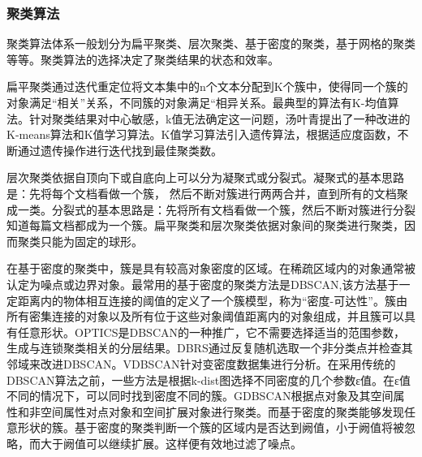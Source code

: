 \subsubsection{聚类算法}
聚类算法体系一般划分为扁平聚类、层次聚类、基于密度的聚类，基于网格的聚类等等\cite{DBLP:journals/coling/Vechtomova09}。聚类算法的选择决定了聚类结果的状态和效率。

扁平聚类通过迭代重定位将文本集中的n个文本分配到K个簇中，使得同一个簇的对象满足“相关”关系，不同簇的对象满足“相异关系。最典型的算法有K-均值算法。针对聚类结果对中心敏感，k值无法确定这一问题，汤叶青\cite{DBLP:tyq}提出了一种改进的K-means算法和K值学习算法。K值学习算法引入遗传算法，根据适应度函数，不断通过遗传操作进行迭代找到最佳聚类数。

层次聚类依据自顶向下或自底向上可以分为凝聚式或分裂式。凝聚式的基本思路是：先将每个文档看做一个簇， 然后不断对簇进行两两合并，直到所有的文档聚成一类。分裂式的基本思路是：先将所有文档看做一个簇，然后不断对簇进行分裂知道每篇文档都成为一个簇。扁平聚类和层次聚类依据对象间的聚类进行聚类，因而聚类只能为固定的球形。

在基于密度的聚类中，簇是具有较高对象密度的区域。在稀疏区域内的对象通常被认定为噪点或边界对象。最常用的基于密度的聚类方法是DBSCAN\cite{DBLP:conf/kdd/EsterKSX96},该方法基于一定距离内的物体相互连接的阈值的定义了一个簇模型，称为“密度-可达性”。簇由所有密集连接的对象以及所有位于这些对象阈值距离内的对象组成，并且簇可以具有任意形状。OPTICS\cite{DBLP:conf/sigmod/AnkerstBKS99}是DBSCAN的一种推广，它不需要选择适当的范围参数，生成与连锁聚类相关的分层结果。DBRS\cite{DBLP:conf/pakdd/WangH03}通过反复随机选取一个非分类点并检查其邻域来改进DBSCAN。VDBSCAN\cite{DBLP:conf/icde/ZhangOT10}针对变密度数据集进行分析。在采用传统的DBSCAN算法之前，一些方法是根据k-dist图选择不同密度的几个参数ε值。在ε值不同的情况下，可以同时找到密度不同的簇。GDBSCAN根据点对象及其空间属性和非空间属性对点对象和空间扩展对象进行聚类。而基于密度的聚类能够发现任意形状的簇。基于密度的聚类判断一个簇的区域内是否达到阙值，小于阙值将被忽略，而大于阙值可以继续扩展。这样便有效地过滤了噪点。
